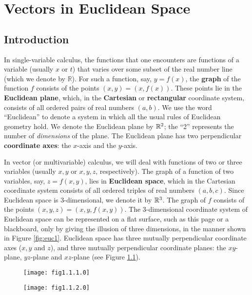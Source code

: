 \chapter{Vectors in Euclidean Space}
\label{chapter:vectors}
\section{Introduction}
In single-variable calculus, the functions that one encounters are functions of a variable (usually $x$ or $t$) 
that varies over some subset of the real number line (which we denote by $\mathbb{R}$).  For such a function, say,
$y = f(x)$, the \textbf{graph} of the function $f$ consists of the points $(x, y) = (x, f(x))$.  These points lie in
the \textbf{Euclidean plane}, which, in the \textbf{Cartesian} or
\textbf{rectangular} coordinate system, consists
of all ordered pairs of real numbers $(a, b)$.  We use the word ``Euclidean'' to denote a system in which all the
usual rules of Euclidean geometry hold.  We denote the Euclidean plane by $\mathbb{R}^{2}$;
the ``2'' represents
the number of \emph{dimensions} of the plane.  The Euclidean plane has two perpendicular
\textbf{coordinate axes}: the $x$-axis and the $y$-axis.

In vector (or multivariable) calculus, we will deal with functions of two or three variables (usually $x, y$ or
$x, y, z$, respectively).  
The graph of a function of two variables, say, $z = f(x,y)$, lies in \textbf{Euclidean space}, which in the Cartesian coordinate system consists of all ordered
triples of real numbers $(a, b, c)$.  Since Euclidean space is 3-dimensional, we denote it by
$\mathbb{R}^{3}$.  The graph of $f$ consists
of the points $(x, y, z) = (x, y, f(x, y))$.  The 3-dimensional coordinate system of Euclidean space can be
represented on a flat surface, such as this page or a blackboard, only by giving the illusion of three
dimensions, in the manner shown in Figure \ref{fig:euc1}.  Euclidean space has three mutually perpendicular
coordinate axes ($x, y$ and $z$), and three mutually perpendicular coordinate planes:
the $xy$-plane, $yz$-plane and $xz$-plane (see Figure \ref{fig:euc2}).
\newline
\begin{figure}[h]
\begin{minipage}[t]{7.5cm}
 \begin{center}
  \texttt{[image: fig1.1.1.0]}
 \end{center}
 \caption[]{}
 \label{fig:euc1}
\end{minipage}
\begin{minipage}[t]{7.5cm}
 \begin{center}
  \texttt{[image: fig1.1.2.0]}
 \end{center}
 \caption[]{}
 \label{fig:euc2}
\end{minipage}
\end{figure}

